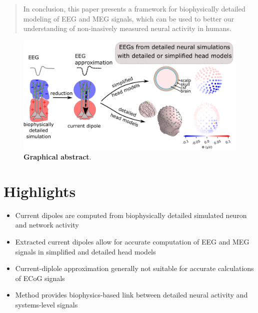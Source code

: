 \documentclass[preprint,10pt,authoryear]{elsarticle}
\begin{document}
\begin{frontmatter}
\begin{abstract}
In conclusion, this paper presents a framework for biophysically detailed modeling of EEG and MEG signals, which can be used to better our understanding of non-inasively measured neural activity in humans.

	\end{abstract}
	
\end{frontmatter}

\linenumbers

	

\begin{figure}[H]
	\centering
	\includegraphics[width=1.0\textwidth]{graph_abst}
	\textbf{Graphical abstract}.
\end{figure}



\section*{Highlights}
\begin{itemize}
\item Current dipoles are computed from biophysically detailed simulated neuron and network activity
\item Extracted current dipoles allow for accurate computation of EEG and MEG signals in simplified and detailed head models
\item Current-diplole approximation generally not suitable for accurate calculations of ECoG signals
\item Method provides biophysics-based link between detailed neural activity and systems-level signals
\end{itemize}
\end{document}
